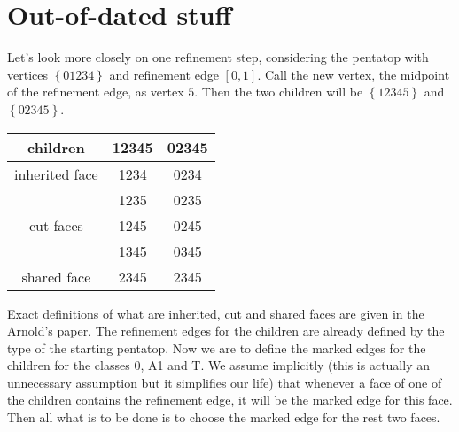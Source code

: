 \documentclass[a4paper,12pt]{amsart}
\numberwithin{equation}{section}
\begin{document}
\section{Out-of-dated stuff}

Let's look more closely on one refinement step, considering the pentatop with vertices $\left\{01234\right\}$ and refinement edge $[0,1]$. Call the new vertex, the midpoint of the refinement edge, as vertex $5$. Then the two children will be $\left\{12345\right\}$ and $\left\{02345\right\}$.

\begin{center}
\begin{tabular}[!h]{|c|c|c|}
\hline
 children & 12345 & 02345 \\ \hline
 inherited face & 1234  & 0234  \\ \hline 
 \multirow{3}{*}{cut faces} & 1235 & 0235 \\
 & 1245 & 0245 \\
 & 1345 & 0345 \\ \hline
 shared face & 2345 & 2345 \\ \hline
\end{tabular}
\end{center}
Exact definitions of what are inherited, cut and shared faces are given in the Arnold's paper.
The refinement edges for the children are already defined by the type of the starting pentatop. Now we are to define the marked edges for the children for the classes 0, A1 and T. We assume implicitly (this is actually an unnecessary assumption but it simplifies our life) that whenever a face of one of the children contains the refinement edge, it will be the marked edge for this face. Then all what is to be done is to choose the marked edge for the rest two faces.
\end{document}
